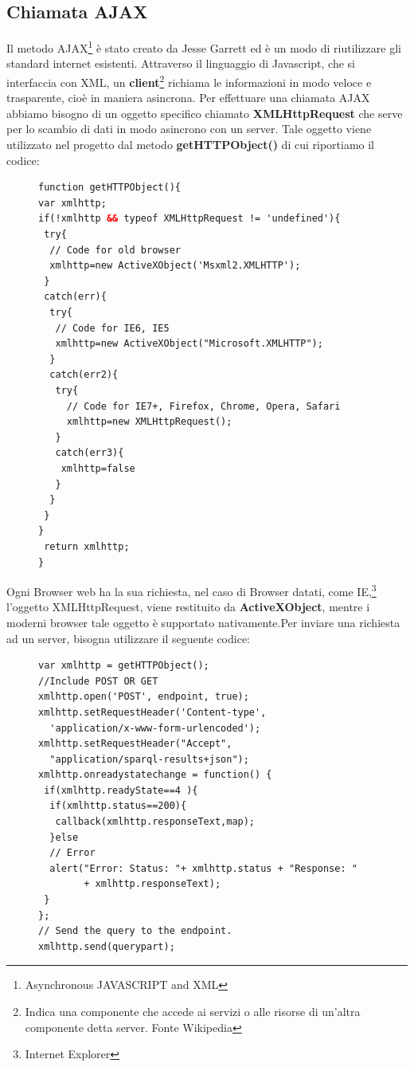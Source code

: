 \documentclass[a4paper,11pt]{article}
\begin{document}
\subsection{Chiamata AJAX}
\label{sec:5.3}
Il metodo AJAX\footnote{Asynchronous JAVASCRIPT and XML} è stato creato da Jesse Garrett ed è un modo di riutilizzare gli standard internet esistenti. 
Attraverso il linguaggio di Javascript, che si interfaccia con XML, un \textbf{client}\footnote{Indica una componente che accede ai servizi o alle risorse di un'altra componente detta server. Fonte Wikipedia} richiama le informazioni in modo veloce e trasparente, cioè in maniera asincrona. Per effettuare una chiamata AJAX abbiamo bisogno di un oggetto specifico chiamato \textbf{XMLHttpRequest} che serve per lo scambio di dati in modo asincrono con un server.
Tale oggetto viene utilizzato nel progetto dal metodo \textbf{getHTTPObject()}
di cui riportiamo il codice:
\begin{figure}[htb]
\begin{lstlisting}[language=HTML, basicstyle=\large]
function getHTTPObject(){
var xmlhttp;
if(!xmlhttp && typeof XMLHttpRequest != 'undefined'){
 try{
  // Code for old browser
  xmlhttp=new ActiveXObject('Msxml2.XMLHTTP');
 }
 catch(err){
  try{
   // Code for IE6, IE5
   xmlhttp=new ActiveXObject("Microsoft.XMLHTTP");
  }
  catch(err2){
   try{
	 // Code for IE7+, Firefox, Chrome, Opera, Safari
	 xmlhttp=new XMLHttpRequest();
   }
   catch(err3){
    xmlhttp=false
   }
  }			
 }
}
 return xmlhttp;
}		
\end{lstlisting}
\end{figure}\newline
Ogni Browser web ha la sua richiesta, nel caso di Browser datati, come IE,\footnote{Internet Explorer} l'oggetto XMLHttpRequest, viene restituito da \textbf{ActiveXObject}, mentre i moderni browser tale oggetto è supportato nativamente.\newpage Per inviare una richiesta ad un server, bisogna utilizzare il seguente codice:
\begin{figure}[htb]
\begin{lstlisting}[language=HTML, basicstyle=\large]
var xmlhttp = getHTTPObject();
//Include POST OR GET
xmlhttp.open('POST', endpoint, true); 
xmlhttp.setRequestHeader('Content-type',
  'application/x-www-form-urlencoded');
xmlhttp.setRequestHeader("Accept", 
  "application/sparql-results+json");	
xmlhttp.onreadystatechange = function() {
 if(xmlhttp.readyState==4 ){
  if(xmlhttp.status==200){				
   callback(xmlhttp.responseText,map);
  }else
  // Error
  alert("Error: Status: "+ xmlhttp.status + "Response: "
		+ xmlhttp.responseText);
 }	
};
// Send the query to the endpoint.
xmlhttp.send(querypart);
\end{lstlisting}
\end{figure}\newline
\end{document}
